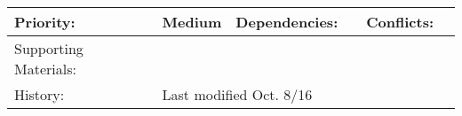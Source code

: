 \documentclass[11pt]{article}
\begin{document}
\begin{center}
\begin{tabular}{|l|l|l|l|l|l|}
Priority:                       & Medium                      & Dependencies:                         &                        & Conflicts:                          &                         \\ \hline
Supporting Materials:           & \multicolumn{5}{l|}{}                                                                                                                                        \\ \hline
History:                        & \multicolumn{5}{l|}{Last modified Oct. 8/16}                                                                                                                 \\ \hline
\end{tabular}



\vspace{10 mm}



\end{center}
\end{document}
